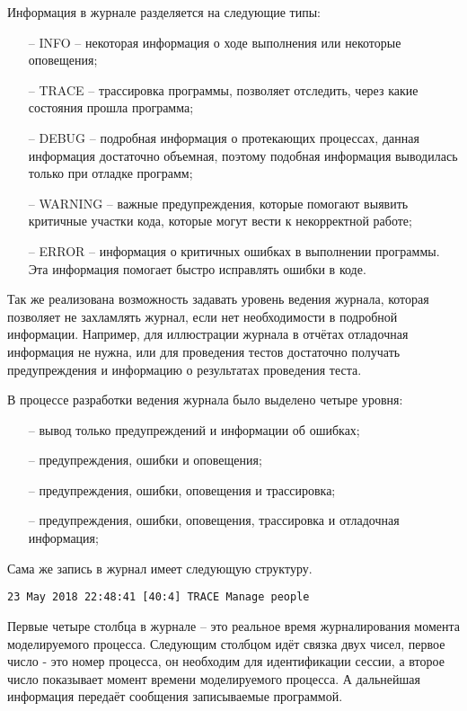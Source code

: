 		Информация в журнале разделяется на следующие типы:
			\begin{itemize}
				\item[--] INFO -- некоторая информация о ходе выполнения или некоторые оповещения;
				\item[--] TRACE -- трассировка программы, позволяет отследить, через какие состояния прошла программа;
				\item[--] DEBUG -- подробная информация о протекающих процессах, данная информация достаточно объемная,
					поэтому подобная информация выводилась только при отладке программ;
				\item[--] WARNING -- важные предупреждения, которые помогают выявить критичные участки кода,
					которые могут вести к некорректной работе;
				\item[--] ERROR -- информация о критичных ошибках в выполнении программы. Эта информация помогает
					быстро исправлять ошибки в коде.
			\end{itemize}

		Так же реализована возможность задавать уровень ведения журнала, которая позволяет не захламлять журнал,
			если нет необходимости в подробной информации. Например, для иллюстрации журнала в отчётах
			отладочная информация не нужна, или для проведения тестов достаточно получать предупреждения
			и информацию о результатах проведения теста.

		В процессе разработки ведения журнала было выделено четыре уровня:
			\begin{itemize}
				\item[--] вывод только предупреждений и информации об ошибках;
				\item[--] предупреждения, ошибки и оповещения;
				\item[--] предупреждения, ошибки, оповещения и трассировка;
				\item[--] предупреждения, ошибки, оповещения, трассировка и отладочная информация;
			\end{itemize}

		Сама же запись в журнал имеет следующую структуру.
\begin{lstlisting}
23 May 2018 22:48:41 [40:4] TRACE Manage people
\end{lstlisting}
		Первые четыре столбца в журнале -- это реальное время журналирования момента моделируемого процесса.
		Следующим столбцом идёт связка двух чисел, первое число - это номер процесса,
		он необходим для идентификации сессии, а второе число показывает момент времени моделируемого процесса.
		А дальнейшая информация передаёт сообщения записываемые программой.

